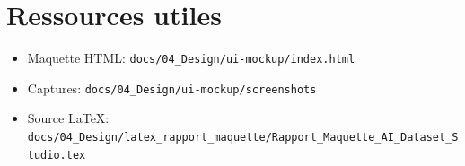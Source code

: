 \documentclass[10pt,a4paper]{article}
\begin{document}
\section{Ressources utiles}

\begin{itemize}
  \item Maquette HTML: \texttt{docs/04\_Design/ui-mockup/index.html}
  \item Captures: \texttt{docs/04\_Design/ui-mockup/screenshots}
  \item Source LaTeX: \texttt{docs/04\_Design/latex\_rapport\_maquette/Rapport\_Maquette\_AI\_Dataset\_Studio.tex}
\end{itemize}
\end{document}
